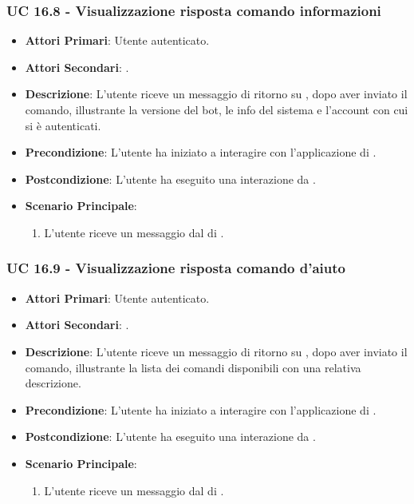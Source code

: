 	\subsubsection{UC 16.8 - Visualizzazione risposta comando informazioni}

	\begin{itemize}
			\item \textbf{Attori Primari}: Utente autenticato.
			\item \textbf{Attori Secondari}: .
			\item \textbf{Descrizione}: L'utente riceve un messaggio di ritorno su , dopo aver inviato il comando, illustrante la versione del bot, le info del sistema e l'account con cui si è autenticati.
			\item \textbf{Precondizione}: L'utente ha iniziato a interagire con l'applicazione di .
			\item \textbf{Postcondizione}: L'utente ha eseguito una interazione da .
			\item \textbf{Scenario Principale}:
			\begin{enumerate}
				\item L'utente riceve un messaggio dal  di .
			\end{enumerate}
		\end{itemize}	

	\subsubsection{UC 16.9 - Visualizzazione risposta comando d'aiuto }

	\begin{itemize}
			\item \textbf{Attori Primari}: Utente autenticato.
			\item \textbf{Attori Secondari}: .
			\item \textbf{Descrizione}: L'utente riceve un messaggio di ritorno su , dopo aver inviato il comando, illustrante la lista dei comandi disponibili con una relativa descrizione.
			\item \textbf{Precondizione}: L'utente ha iniziato a interagire con l'applicazione di .
			\item \textbf{Postcondizione}: L'utente ha eseguito una interazione da .
			\item \textbf{Scenario Principale}:
			\begin{enumerate}
				\item L'utente riceve un messaggio dal  di .
			\end{enumerate}
		\end{itemize}	



